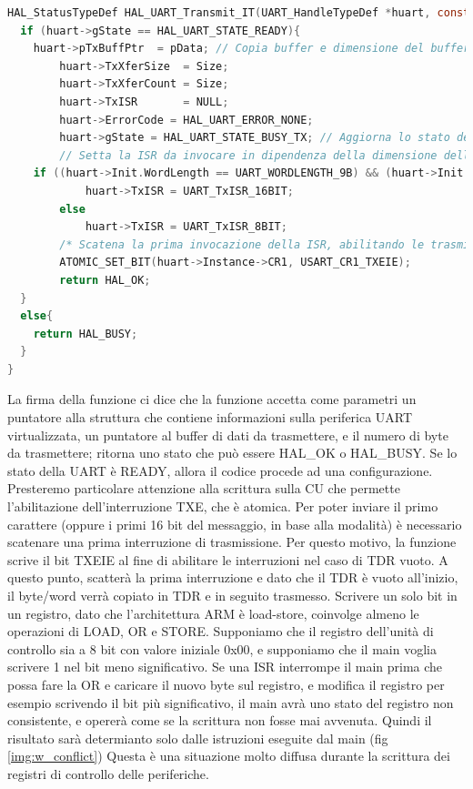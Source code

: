 \begin{lstlisting}[language=C]
HAL_StatusTypeDef HAL_UART_Transmit_IT(UART_HandleTypeDef *huart, const uint8_t *pData, uint16_t Size){
  if (huart->gState == HAL_UART_STATE_READY){
   	huart->pTxBuffPtr  = pData; // Copia buffer e dimensione del buffer.
    	huart->TxXferSize  = Size;
    	huart->TxXferCount = Size;
    	huart->TxISR       = NULL;
    	huart->ErrorCode = HAL_UART_ERROR_NONE; 
    	huart->gState = HAL_UART_STATE_BUSY_TX; // Aggiorna lo stato della periferica per indicare che ci sia una trasmissione in atto.
    	// Setta la ISR da invocare in dipendenza della dimensione della parola
	if ((huart->Init.WordLength == UART_WORDLENGTH_9B) && (huart->Init.Parity == UART_PARITY_NONE))
      		huart->TxISR = UART_TxISR_16BIT;
    	else
      		huart->TxISR = UART_TxISR_8BIT;
    	/* Scatena la prima invocazione della ISR, abilitando le trasmissioni di Transmit Buffer Enable*/
    	ATOMIC_SET_BIT(huart->Instance->CR1, USART_CR1_TXEIE);
    	return HAL_OK;
  }
  else{
    return HAL_BUSY;
  }
}
\end{lstlisting}

La firma della funzione ci dice che la funzione accetta come parametri un puntatore alla struttura che contiene informazioni sulla periferica UART virtualizzata, un puntatore al buffer di dati da trasmettere, e il numero di byte da trasmettere; ritorna uno stato che può essere HAL\_OK o HAL\_BUSY. 
Se lo stato della UART è READY, allora il codice procede ad una configurazione. Presteremo particolare attenzione alla scrittura sulla CU che permette l'abilitazione dell'interruzione TXE, che è atomica.
Per poter inviare il primo carattere (oppure i primi 16 bit del messaggio, in base alla modalità) è necessario scatenare una prima interruzione di trasmissione. Per questo motivo, la funzione scrive il bit TXEIE al fine di abilitare le interruzioni nel caso di TDR vuoto. A questo punto, scatterà la prima interruzione e dato che il TDR è vuoto all'inizio, il byte/word verrà copiato in TDR e in seguito trasmesso.
Scrivere un solo bit in un registro, dato che l'architettura ARM è load-store, coinvolge almeno le operazioni di LOAD, OR e STORE. 
Supponiamo che il registro dell'unità di controllo sia a 8 bit con valore iniziale 0x00, e supponiamo che il main voglia scrivere 1 nel bit meno significativo. Se una ISR interrompe il main prima che possa fare la OR e caricare il nuovo byte sul registro, e modifica il registro per esempio scrivendo il bit più significativo, il main avrà uno stato del registro non consistente, e opererà come se la scrittura non fosse mai avvenuta. Quindi il risultato sarà determianto solo dalle istruzioni eseguite dal main (fig \ref{img:w_conflict}) 
Questa è una situazione molto diffusa durante la scrittura dei registri di controllo delle periferiche.

